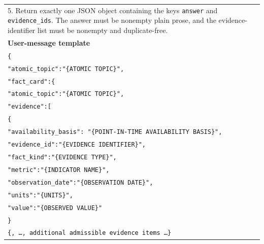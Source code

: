 \begin{table}[htbp]
\begin{tabular}{@{}p{}@{}}
        5. Return exactly one JSON object containing the keys
        \texttt{answer} and \texttt{evidence\_ids}. The answer must be nonempty
        plain prose, and the evidence-identifier list must be nonempty and
        duplicate-free. \\[8pt]

        \textbf{User-message template} \\[3pt]

        \texttt{\{} \\
        \hspace*{1em}\texttt{"atomic\_topic":"\{ATOMIC TOPIC\}",} \\

        \hspace*{1em}\texttt{"fact\_card":\{} \\
        \hspace*{2em}\texttt{"atomic\_topic":"\{ATOMIC TOPIC\}",} \\
        \hspace*{2em}\texttt{"evidence":[} \\

        \hspace*{3em}\texttt{\{} \\
        \hspace*{4em}\texttt{"availability\_basis":
        "\{POINT-IN-TIME AVAILABILITY BASIS\}",} \\
        \hspace*{4em}\texttt{"evidence\_id":"\{EVIDENCE IDENTIFIER\}",} \\
        \hspace*{4em}\texttt{"fact\_kind":"\{EVIDENCE TYPE\}",} \\
        \hspace*{4em}\texttt{"metric":"\{INDICATOR NAME\}",} \\
        \hspace*{4em}\texttt{"observation\_date":"\{OBSERVATION DATE\}",} \\
        \hspace*{4em}\texttt{"units":"\{UNITS\}",} \\
        \hspace*{4em}\texttt{"value":"\{OBSERVED VALUE\}"} \\
        \hspace*{3em}\texttt{\}} \\

        \hspace*{3em}\texttt{\{, \ldots, additional admissible evidence
        items \ldots\}} \\


\end{tabular}
\end{table}
